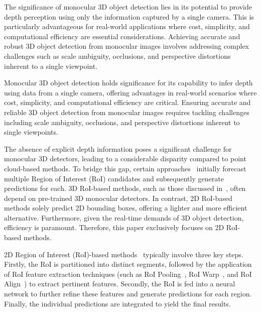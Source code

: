 \documentclass[journal]{IEEEtran}
\begin{document}
	The significance of monocular 3D object detection lies in its potential to provide depth perception using only the information captured by a single camera. This is particularly advantageous for real-world applications where cost, simplicity, and computational efficiency are essential considerations. Achieving accurate and robust 3D object detection from monocular images involves addressing complex challenges such as scale ambiguity, occlusions, and perspective distortions inherent to a single viewpoint.
	
	Monocular 3D object detection holds significance for its capability to infer depth using data from a single camera, offering advantages in real-world scenarios where cost, simplicity, and computational efficiency are critical. Ensuring accurate and reliable 3D object detection from monocular images requires tackling challenges including scale ambiguity, occlusions, and perspective distortions inherent to single viewpoints.
	
	The absence of explicit depth information poses a significant challenge for monocular 3D detectors, leading to a considerable disparity compared to point cloud-based methods. To bridge this gap, certain approaches~\cite{gupnet, didm3d, neurocs} initially forecast multiple Region of Interest (RoI) candidates and subsequently generate predictions for each. 3D RoI-based methods, such as those discussed in~\cite{neurocs}, often depend on pre-trained 3D monocular detectors. In contrast, 2D RoI-based methods solely predict 2D bounding boxes, offering a lighter and more efficient alternative. Furthermore, given the real-time demands of 3D object detection, efficiency is paramount. Therefore, this paper exclusively focuses on 2D RoI-based methods.
	
	2D Region of Interest (RoI)-based methods~\cite{gupnet, didm3d} typically involve three key steps. Firstly, the RoI is partitioned into distinct segments, followed by the application of RoI feature extraction techniques (such as RoI Pooling~\cite{fast-rcnn}, RoI Warp~\cite{roi-warp}, and RoI Align~\cite{mask-rcnn}) to extract pertinent features. Secondly, the RoI is fed into a neural network to further refine these features and generate predictions for each region. Finally, the individual predictions are integrated to yield the final results.
	
\end{document}
